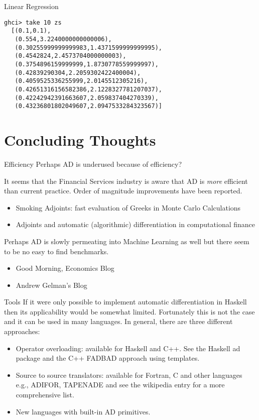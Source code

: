 \documentclass{beamer}
\begin{document}
\begin{frame}[fragile]{Linear Regression}
\begin{scriptsize}
\begin{lstlisting}
ghci> take 10 zs
  [(0.1,0.1),
   (0.554,3.2240000000000006),
   (0.30255999999999983,1.4371599999999995),
   (0.4542824,2.4573704000000003),
   (0.3754896159999999,1.8730778559999997),
   (0.42839290304,2.2059302422400004),
   (0.4059525336255999,2.0145512305216),
   (0.42651316156582386,2.1228327781207037),
   (0.42242942391663607,2.059837404270339),
   (0.43236801802049607,2.0947533284323567)]
\end{lstlisting}
\end{scriptsize}
\end{frame}

\section{Concluding Thoughts}

\begin{frame}[fragile]{Efficiency}
Perhaps AD is underused because of efficiency?

It seems that the Financial Services industry is aware that AD is {\em
  more} efficient than current practice. Order of magnitude
improvements have been reported.
\begin{itemize}
\item
Smoking Adjoints: fast evaluation of Greeks in Monte Carlo Calculations
\item
Adjoints and automatic (algorithmic) differentiation in computational finance
\end{itemize}

Perhaps AD is slowly permeating into Machine Learning as well but
there seem to be no easy to find benchmarks.

\begin{itemize}
\item
Good Morning, Economics Blog
\item
Andrew Gelman's Blog
\end{itemize}
\end{frame}

\begin{frame}[fragile]{Tools}
  If it were only possible to implement automatic differentiation in
  Haskell then its applicability would be somewhat
  limited. Fortunately this is not the case and it can be used in many
  languages. In general, there are three different approaches:

\begin{itemize}
\item Operator overloading: available for Haskell and C++. See the
  Haskell ad package and the C++ FADBAD approach using templates.
\item Source to source translators: available for Fortran, C and other
  languages e.g., ADIFOR, TAPENADE and see the wikipedia entry for a
  more comprehensive list.
\item New languages with built-in AD primitives.
\end{itemize}
\end{frame}
\end{document}
